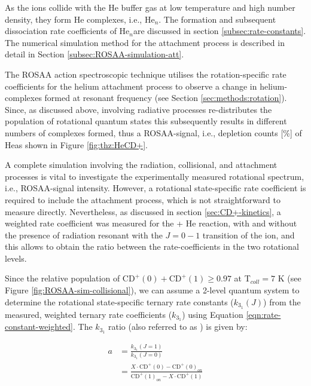 As the \CD ions collide with the He buffer gas at low temperature and high
number density, they form He complexes, i.e., He$_n$\CD. The formation and
subsequent dissociation rate coefficients of He$_n$\CD are discussed in section
\ref{subsec:rate-constants}. The numerical simulation method for the attachment
process is described in detail in Section \ref{subsec:ROSAA-simulation-att}.

The ROSAA action spectroscopic technique utilises the rotation-specific
rate coefficients for the helium attachment process to observe a change in
helium-complexes formed at resonant frequency (see Section
\ref{sec:methods:rotation}). Since, as discussed above, involving radiative
processes re-distributes the population of rotational quantum states this
subsequently results in different numbers of complexes formed, thus a
ROSAA-signal, i.e., depletion counts [\%] of He\CD as shown in Figure
\ref{fig:thz:HeCD+}.

A complete simulation involving the radiation, collisional, and attachment
processes is vital to investigate the experimentally measured rotational
spectrum, i.e., ROSAA-signal intensity. However, a rotational state-specific
rate coefficient is required to include the attachment process, which is not
straightforward to measure directly. Nevertheless, as discussed in section
\ref{sec:CD+-kinetics}, a weighted rate coefficient was measured for the \CD + He 
reaction, with and without the presence of radiation resonant with
the $J=0-1$ transition of the \CD ion, and this allows to obtain the ratio between the
rate-coefficients in the two rotational levels.

Since the relative population of ${\text{CD}^+}(0) + \text{CD}^+(1) \geq 0.97 $
at T$_{coll}=7$ K (see Figure \ref{fig:ROSAA-sim-collisional}), we can assume a
2-level quantum system to determine the rotational state-specific ternary rate
constants ($k_{3_1}(J)$) from the measured, weighted ternary rate coefficients
($k_{3_1}$) using Equation \ref{eqn:rate-constant-weighted}. The $k_{3_1}$
ratio (also referred to as ) is given by:

\begin{equation}
    \begin{split}
        a & = \frac{k_{3_1}(J=1)}{k_{3_1}(J=0)}\\
        & = \frac{X \cdot \text{CD}^+(0) - \text{CD}^+(0)_{on}}{\text{CD}^+(1)_{on} - X\cdot \text{CD}^+(1)}
    \end{split}
    \label{eqns:rate-constant-change-ratio}
\end{equation}

